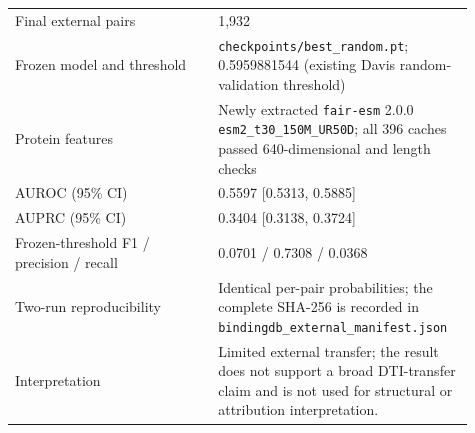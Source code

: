 \documentclass[11pt]{article}
\begin{document}
\begin{table}[H]
\begin{tabular}{p{0.42\linewidth}p{0.49\linewidth}}
Final external pairs & 1,932 \\
Frozen model and threshold & \texttt{checkpoints/best\_random.pt}; 0.5959881544 (existing Davis random-validation threshold) \\
Protein features & Newly extracted \texttt{fair-esm} 2.0.0 \texttt{esm2\_t30\_150M\_UR50D}; all 396 caches passed 640-dimensional and length checks \\
AUROC (95\% CI) & 0.5597 [0.5313, 0.5885] \\
AUPRC (95\% CI) & 0.3404 [0.3138, 0.3724] \\
Frozen-threshold F1 / precision / recall & 0.0701 / 0.7308 / 0.0368 \\
Two-run reproducibility & Identical per-pair probabilities; the complete SHA-256 is recorded in \texttt{bindingdb\_external\_manifest.json} \\
Interpretation & Limited external transfer; the result does not support a broad DTI-transfer claim and is not used for structural or attribution interpretation. \\
\bottomrule
\end{tabular}
\end{table}
\end{document}
